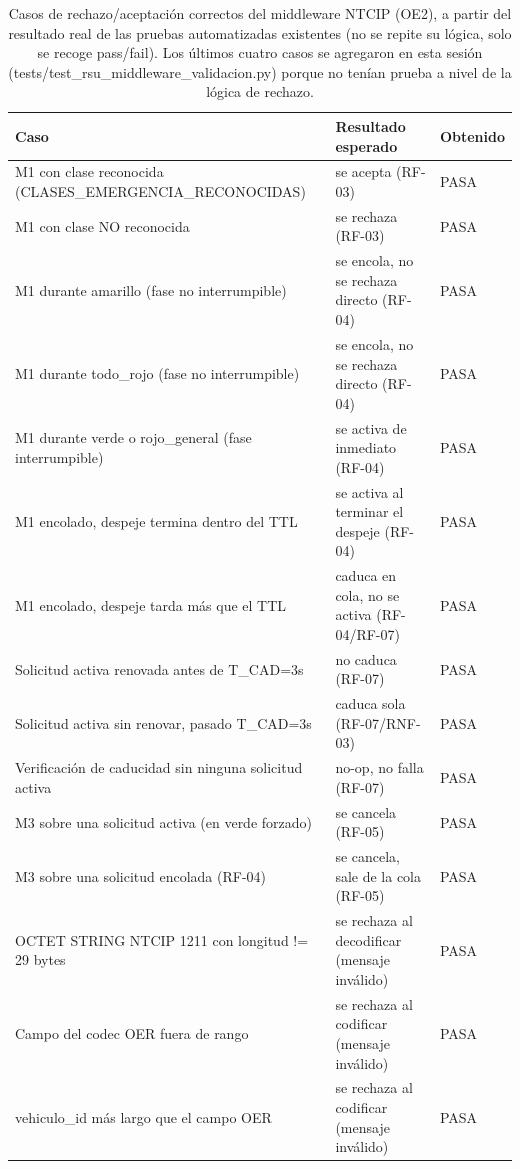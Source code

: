 \begin{table}[H]
\centering
\caption{Casos de rechazo/aceptación correctos del middleware NTCIP (OE2), a partir del resultado real de las pruebas automatizadas existentes (no se repite su lógica, solo se recoge pass/fail). Los últimos cuatro casos se agregaron en esta sesión (tests/test\_rsu\_middleware\_validacion.py) porque no tenían prueba a nivel de la lógica de rechazo.}
\label{tab:ntcip_rechazo}
\small
\begin{tabular}{p{5.2cm}p{4.5cm}p{1.6cm}}
\toprule
\textbf{Caso} & \textbf{Resultado esperado} & \textbf{Obtenido} \\
\midrule
M1 con clase reconocida (CLASES\_EMERGENCIA\_RECONOCIDAS) & se acepta (RF-03) & PASA \\
M1 con clase NO reconocida & se rechaza (RF-03) & PASA \\
M1 durante amarillo (fase no interrumpible) & se encola, no se rechaza directo (RF-04) & PASA \\
M1 durante todo\_rojo (fase no interrumpible) & se encola, no se rechaza directo (RF-04) & PASA \\
M1 durante verde o rojo\_general (fase interrumpible) & se activa de inmediato (RF-04) & PASA \\
M1 encolado, despeje termina dentro del TTL & se activa al terminar el despeje (RF-04) & PASA \\
M1 encolado, despeje tarda más que el TTL & caduca en cola, no se activa (RF-04/RF-07) & PASA \\
Solicitud activa renovada antes de T\_CAD=3s & no caduca (RF-07) & PASA \\
Solicitud activa sin renovar, pasado T\_CAD=3s & caduca sola (RF-07/RNF-03) & PASA \\
Verificación de caducidad sin ninguna solicitud activa & no-op, no falla (RF-07) & PASA \\
M3 sobre una solicitud activa (en verde forzado) & se cancela (RF-05) & PASA \\
M3 sobre una solicitud encolada (RF-04) & se cancela, sale de la cola (RF-05) & PASA \\
OCTET STRING NTCIP 1211 con longitud != 29 bytes & se rechaza al decodificar (mensaje inválido) & PASA \\
Campo del codec OER fuera de rango & se rechaza al codificar (mensaje inválido) & PASA \\
vehiculo\_id más largo que el campo OER & se rechaza al codificar (mensaje inválido) & PASA \\

\end{tabular}
\end{table}

